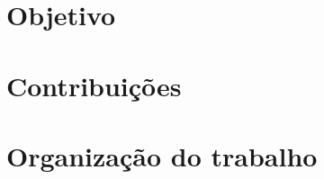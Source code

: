 \section{Objetivo}
\label{sec:objetivo}

\section{Contribuições}
\label{sec:contribuicoes}



\section{Organização do trabalho}
\label{sec:organizacao}